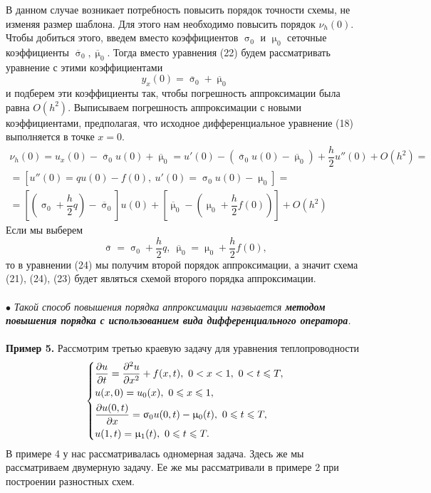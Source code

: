 \documentclass[a4paper, 12pt]{report}
\numberwithin{equation}{section}
\newcommand{\ol}{\overline}
\renewcommand{\leq}{\leqslant}
\renewcommand{\sigma}{\upsigma}
\renewcommand{\mu}{\upmu}
\renewcommand{\d}{\partial}
\begin{document}
	В данном случае возникает потребность повысить порядок точности схемы, не изменяя размер шаблона. Для этого нам необходимо повысить порядок $\nu_h(0)$. Чтобы добиться этого, введем вместо коэффициентов $\sigma_0$ и $\mu_0$ сеточные коэффициенты $\ol \sigma_0, \ol \mu _0$. Тогда вместо уравнения (22) будем рассматривать уравнение с этими коэффициентами
	\begin{equation}
		y_x(0) = \ol \sigma_0 + \ol \mu _0
	\end{equation}
и подберем эти коэффициенты так, чтобы погрешность аппроксимации была равна $O(h^2)$. Выписываем погрешность аппроксимации с новыми коэффициентами, предполагая, что исходное дифференциальное уравнение (18) выполняется в точке $x =0$.
\begin{multline*}
	 	\nu_h(0) = u_x(0) - \ol\sigma_0 u(0) + \ol\mu_0 = u'(0) - (\ol\sigma_0 u(0) - \ol \mu_0)+ \dfrac h2 u''(0) + O(h^2) =\\= [u''(0) =qu(0) - f(0),\ u'(0)=\sigma_0 u(0) - \mu_0] =\\= \left[\left(\sigma_0 + \dfrac h2 q\right) - \ol\sigma_0\right]u(0) + \left[\ol \mu_0 - \left(\mu_0 + \dfrac h2 f(0)\right)\right] + O(h^2)
\end{multline*}
Если мы выберем
$$\ol \sigma = \sigma_0 + \dfrac h2 q,\ \ol\mu_0 = \mu_0 + \dfrac h2 f(0),$$ то в уравнении (24) мы получим второй порядок аппроксимации, а значит схема (21), (24), (23) будет являться схемой второго порядка аппроксимации.\\\\
	$\bullet$ \textit{Такой способ повышения порядка аппроксимации назвыается \textbf{методом повышения порядка с использованием вида дифференциального оператора}.}\\\\
	\textbf{Пример 5.} Рассмотрим третью краевую задачу для уравнения теплопроводности
	\begin{equation}
		\begin{dcases}
		\dfrac{\d u}{\d t} = \dfrac{\d ^2 u}{\d x^2} + f(x,t),\ 0 < x < 1,\ 0 < t \leq T,\\
		u(x,0) = u_0(x),\ 0 \leq x \leq 1,\\
		\dfrac{\d u(0,t)}{\d x} = \sigma_0 u(0,t) - \mu_0(t),\ 0 \leq t \leq T,\\
		u(1,t) = \mu_1(t),\ 0 \leq t \leq T.
	\end{dcases}
	\end{equation}
	В примере 4 у нас рассматривалась одномерная задача. Здесь же мы рассматриваем двумерную задачу. Ее же мы рассматривали в примере 2 при построении разностных схем.
\end{document}

